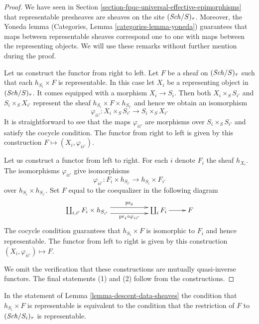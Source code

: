 \begin{proof}
We have seen in Section \ref{section-fpqc-universal-effective-epimorphisms}
that representable presheaves are sheaves on the site $(\mathit{Sch}/S)_\tau$.
Moreover, the Yoneda lemma (Categories, Lemma \ref{categories-lemma-yoneda})
guarantees that maps between representable
sheaves correspond one to one with maps between the representing objects.
We will use these remarks without further mention during the proof.

\medskip\noindent
Let us construct the functor from right to left.
Let $F$ be a sheaf on $(\mathit{Sch}/S)_\tau$ such that each
$h_{S_i} \times F$ is representable. In this case let $X_i$
be a representing object in $(\mathit{Sch}/S)_\tau$.
It comes equipped with a morphism $X_i \to S_i$.
Then both $X_i \times_S S_{i'}$ and $S_i \times_S X_{i'}$
represent the sheaf $h_{S_i} \times F \times h_{S_{i'}}$
and hence we obtain an isomorphism
$$
\varphi_{ii'} : X_i \times_S S_{i'} \to S_i \times_S X_{i'}
$$
It is straightforward to see that the maps $\varphi_{ii'}$
are morphisms over $S_i \times_S S_{i'}$ and satisfy the
cocycle condition. The functor from right to left is given
by this construction $F \mapsto (X_i, \varphi_{ii'})$.

\medskip\noindent
Let us construct a functor from left to right.
For each $i$ denote $F_i$ the sheaf $h_{X_i}$.
The isomorphisms $\varphi_{ii'}$ give isomorphisms
$$
\varphi_{ii'} :
F_i \times h_{S_{i'}}
\longrightarrow
h_{S_i} \times F_{i'}
$$
over $h_{S_i} \times h_{S_{i'}}$.
Set $F$ equal to the coequalizer in the following diagram
$$
\xymatrix{
\coprod_{i, i'} F_i \times h_{S_{i'}}
\ar@<1ex>[rr]^-{\text{pr}_0}
\ar@<-1ex>[rr]_-{\text{pr}_1 \circ \varphi_{ii'}}
& &
\coprod_i F_i \ar[r]
&
F
}
$$
The cocycle condition guarantees that $h_{S_i} \times F$ is
isomorphic to $F_i$ and hence representable.
The functor from left to right is given
by this construction $(X_i, \varphi_{ii'}) \mapsto F$.

\medskip\noindent
We omit the verification that these constructions
are mutually quasi-inverse functors. The final statements
(1) and (2) follow from the constructions.
\end{proof}

\begin{remark}
\label{remark-what-product-means}
In the statement of Lemma \ref{lemma-descent-data-sheaves} the condition that
$h_{S_i} \times F$ is representable is equivalent to
the condition that the restriction of $F$ to
$(\mathit{Sch}/S_i)_\tau$ is representable.
\end{remark}























